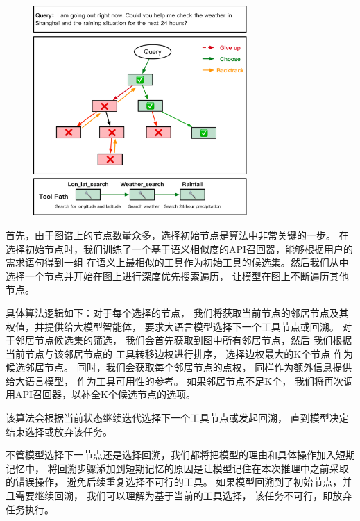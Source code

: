 \begin{figure}[!htp]
  \vspace{1em}
  \centering
  \setlength{\abovecaptionskip}{10pt} %
  \includegraphics[height=8cm]{../assets/ch4-dfs算法.pdf}
  \label{fig:ch4-dfs}
\end{figure}

首先，由于图谱上的节点数量众多，选择初始节点是算法中非常关键的一步。
在选择初始节点时，我们训练了一个基于语义相似度的API召回器，能够根据用户的需求语句得到一组
在语义上最相似的工具作为初始工具的候选集。然后我们从中选择一个节点并开始在图上进行深度优先搜索遍历，
让模型在图上不断遍历其他节点。

具体算法逻辑如下：对于每个选择的节点，
我们将获取当前节点的邻居节点及其权值，并提供给大模型智能体，
要求大语言模型选择下一个工具节点或回溯。
对于邻居节点候选集的筛选，
我们会首先获取到图中所有邻居节点，然后
我们根据当前节点与该邻居节点的
工具转移边权进行排序，
选择边权最大的K个节点
作为候选邻居节点。
同时，我们会获取每个邻居节点的点权，
同样作为额外信息提供给大语言模型，
作为工具可用性的参考。
如果邻居节点不足K个，
我们将再次调用API召回器，以补全K个候选节点的选项。

该算法会根据当前状态继续迭代选择下一个工具节点或发起回溯，
直到模型决定结束选择或放弃该任务。

不管模型选择下一节点还是选择回溯，我们都将把模型的理由和具体操作加入短期记忆中，
将回溯步骤添加到短期记忆的原因是让模型记住在本次推理中之前采取的错误操作，
避免后续重复选择不可行的工具。
如果模型回溯到了初始节点，并且需要继续回溯，
我们可以理解为基于当前的工具选择，
该任务不可行，即放弃任务执行。



